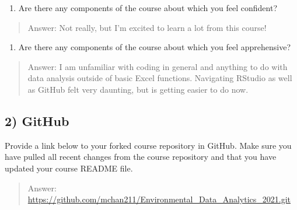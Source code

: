 \documentclass[
]{article}
\providecommand{\tightlist}{%
  \setlength{\itemsep}{0pt}\setlength{\parskip}{0pt}}
\begin{document}
\begin{enumerate}
\def\labelenumi{\arabic{enumi}.}
\setcounter{enumi}{1}
\tightlist
\item
  Are there any components of the course about which you feel confident?
\end{enumerate}

\begin{quote}
Answer: Not really, but I'm excited to learn a lot from this course!
\end{quote}

\begin{enumerate}
\def\labelenumi{\arabic{enumi}.}
\setcounter{enumi}{2}
\tightlist
\item
  Are there any components of the course about which you feel
  apprehensive?
\end{enumerate}

\begin{quote}
Answer: I am unfamiliar with coding in general and anything to do with
data analysis outside of basic Excel functions. Navigating RStudio as
well as GitHub felt very daunting, but is getting easier to do now.
\end{quote}

\hypertarget{github}{%
\subsection{2) GitHub}\label{github}}

Provide a link below to your forked course repository in GitHub. Make
sure you have pulled all recent changes from the course repository and
that you have updated your course README file.

\begin{quote}
Answer:
\url{https://github.com/mchan211/Environmental_Data_Analytics_2021.git}
\end{quote}
\end{document}
